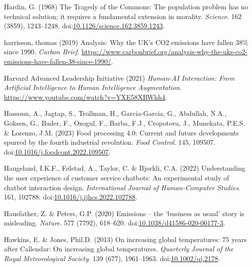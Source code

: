 \documentclass[
  letterpaper,
  DIV=11,
  numbers=noendperiod]{scrartcl}
\newlength{\cslhangindent}
\newenvironment{CSLReferences}[2] %
 {\begin{list}{}{%
  \setlength{\itemindent}{0pt}
  \setlength{\leftmargin}{0pt}
  \setlength{\parsep}{0pt}
  \ifodd #1
   \setlength{\leftmargin}{\cslhangindent}
   \setlength{\itemindent}{-1\cslhangindent}
  \fi
  \setlength{\itemsep}{#2\baselineskip}}}
 {\end{list}}
\begin{document}
\begin{CSLReferences}{0}{1}
Hardin, G. (1968) The {Tragedy} of the {Commons}: {The} population
problem has no technical solution; it requires a fundamental extension
in morality. \emph{Science}. 162 (3859), 1243--1248.
doi:\href{https://doi.org/10.1126/science.162.3859.1243}{10.1126/science.162.3859.1243}.

harrisson, thomas (2019) Analysis: {Why} the {UK}'s {CO2} emissions have
fallen 38\% since 1990. \emph{Carbon Brief}.
\url{https://www.carbonbrief.org/analysis-why-the-uks-co2-emissions-have-fallen-38-since-1990/}.

Harvard Advanced Leadership Initiative (2021) \emph{Human-{AI
Interaction}: {From Artificial Intelligence} to {Human Intelligence
Augmentation}}. \url{https://www.youtube.com/watch?v=YXE58XRWhh4}.

Hassoun, A., Jagtap, S., Trollman, H., Garcia-Garcia, G., Abdullah,
N.A., Goksen, G., Bader, F., Ozogul, F., Barba, F.J., Cropotova, J.,
Munekata, P.E.S. \& Lorenzo, J.M. (2023) Food processing 4.0: {Current}
and future developments spurred by the fourth industrial revolution.
\emph{Food Control}. 145, 109507.
doi:\href{https://doi.org/10.1016/j.foodcont.2022.109507}{10.1016/j.foodcont.2022.109507}.

Haugeland, I.K.F., Følstad, A., Taylor, C. \& Bjørkli, C.A. (2022)
Understanding the user experience of customer service chatbots: {An}
experimental study of chatbot interaction design. \emph{International
Journal of Human-Computer Studies}. 161, 102788.
doi:\href{https://doi.org/10.1016/j.ijhcs.2022.102788}{10.1016/j.ijhcs.2022.102788}.

Hausfather, Z. \& Peters, G.P. (2020) Emissions -- the {`business as
usual'} story is misleading. \emph{Nature}. 577 (7792), 618--620.
doi:\href{https://doi.org/10.1038/d41586-020-00177-3}{10.1038/d41586-020-00177-3}.

Hawkins, E. \& Jones, Phil.D. (2013) On increasing global temperatures:
75 years after {Callendar}: {On} increasing global temperatures.
\emph{Quarterly Journal of the Royal Meteorological Society}. 139 (677),
1961--1963. doi:\href{https://doi.org/10.1002/qj.2178}{10.1002/qj.2178}.


\end{CSLReferences}
\end{document}
